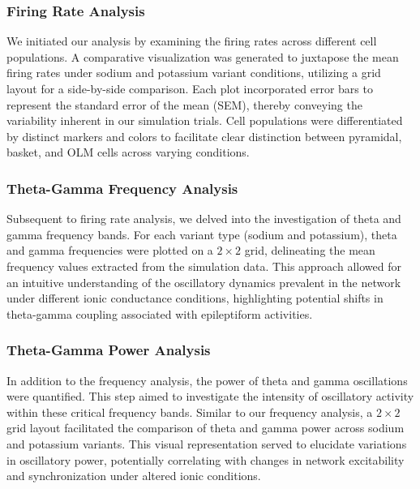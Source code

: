\subsubsection{Firing Rate Analysis}
We initiated our analysis by examining the firing rates across different cell
populations. A comparative visualization was generated to juxtapose the mean
firing rates under sodium and potassium variant conditions, utilizing a grid
layout for a side-by-side comparison. Each plot incorporated error bars to
represent the standard error of the mean (SEM), thereby conveying the
variability inherent in our simulation trials. Cell populations were
differentiated by distinct markers and colors to facilitate clear distinction
between pyramidal, basket, and OLM cells across varying conditions.

\subsubsection{Theta-Gamma Frequency Analysis}
Subsequent to firing rate analysis, we delved into the investigation of theta
and gamma frequency bands. For each variant type (sodium and potassium), theta
and gamma frequencies were plotted on a \(2\times2\) grid, delineating the mean
frequency values extracted from the simulation data. This approach allowed for
an intuitive understanding of the oscillatory dynamics prevalent in the network
under different ionic conductance conditions, highlighting potential shifts in
theta-gamma coupling associated with epileptiform activities.

\subsubsection{Theta-Gamma Power Analysis}
In addition to the frequency analysis, the power of theta and gamma oscillations were quantified.
This step aimed to investigate the intensity of oscillatory activity within these critical frequency bands.
Similar to our frequency analysis, a \(2\times2\) grid layout facilitated the comparison of theta and gamma power
across sodium and potassium variants. This visual representation served to
elucidate variations in oscillatory power, potentially correlating with changes
in network excitability and synchronization under altered ionic conditions.\\

